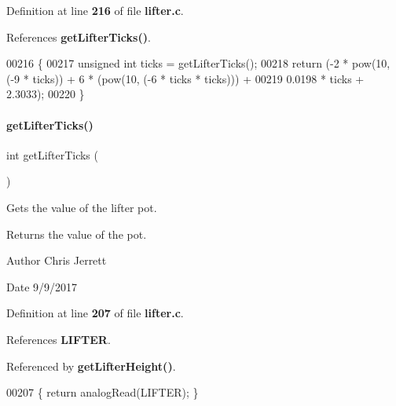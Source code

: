 Definition at line \textbf{ 216} of file \textbf{ lifter.\+c}.



References \textbf{ get\+Lifter\+Ticks()}.


\begin{DoxyCode}
00216                          \{
00217   \textcolor{keywordtype}{unsigned} \textcolor{keywordtype}{int} ticks = getLifterTicks();
00218   \textcolor{keywordflow}{return} (-2 * pow(10, (-9 * ticks)) + 6 * (pow(10, (-6 * ticks * ticks))) +
00219           0.0198 * ticks + 2.3033);
00220 \}
\end{DoxyCode}
\mbox{\label{a00107_acdf909159b0406c48099843f2306be78}} 
\paragraph{get\+Lifter\+Ticks()}
{\footnotesize\ttfamily int get\+Lifter\+Ticks (\begin{DoxyParamCaption}{ }\end{DoxyParamCaption})}



Gets the value of the lifter pot. 

\begin{DoxyReturn}{Returns}
the value of the pot. 
\end{DoxyReturn}
\begin{DoxyAuthor}{Author}
Chris Jerrett 
\end{DoxyAuthor}
\begin{DoxyDate}{Date}
9/9/2017 
\end{DoxyDate}


Definition at line \textbf{ 207} of file \textbf{ lifter.\+c}.



References \textbf{ L\+I\+F\+T\+ER}.



Referenced by \textbf{ get\+Lifter\+Height()}.


\begin{DoxyCode}
00207 \{ \textcolor{keywordflow}{return} analogRead(LIFTER); \}
\end{DoxyCode}
\mbox{\label{a00107_ab0460888f3213e5510bd25ae1e152a75}} 
